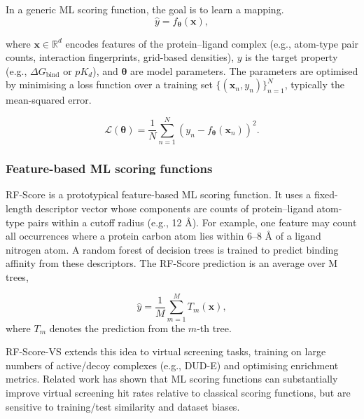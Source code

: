 \documentclass[12pt]{article}
\begin{document}
In a generic ML scoring function, the goal is to learn a mapping.
\begin{equation}
    \hat{y} = f_{\boldsymbol{\theta}}(\mathbf{x}),
\end{equation}

where $\mathbf{x} \in \mathbb{R}^d$ encodes features of the protein--ligand complex (e.g., atom-type pair counts, interaction fingerprints, grid-based densities), $y$ is the target property (e.g., $\Delta G_{\text{bind}}$ or $pK_d$), and $\boldsymbol{\theta}$ are model parameters. The parameters are optimised by minimising a loss function over a training set $\{(\mathbf{x}_n, y_n)\}_{n=1}^N$, typically the mean-squared error.

\begin{equation}
    \mathcal{L}(\boldsymbol{\theta}) = \frac{1}{N} \sum_{n=1}^N \left( y_n - f_{\boldsymbol{\theta}}(\mathbf{x}_n) \right)^2.
\end{equation}

\subsubsection{Feature-based ML scoring functions}
RF-Score is a prototypical feature-based ML scoring function\cite{CH3_Ballester2010_RFScore}. It uses a fixed-length descriptor vector whose components are counts of protein--ligand atom-type pairs within a cutoff radius (e.g., 12 \r{A}). For example, one feature may count all occurrences where a protein carbon atom lies within 6--8 \r{A} of a ligand nitrogen atom. A random forest of decision trees is trained to predict binding affinity from these descriptors. The RF-Score prediction is an average over M trees,

\begin{equation}
    \hat{y} = \frac{1}{M} \sum_{m=1}^{M} T_m(\mathbf{x}),
\end{equation}
where $T_m$ denotes the prediction from the $m$-th tree.

RF-Score-VS\cite{CH3_Wojcikowski2017_RFScoreVS} extends this idea to virtual screening tasks, training on large numbers of active/decoy complexes (e.g., DUD-E) and optimising enrichment metrics. Related work\cite{CH3_li2021machine,CH3_li2017structural} has shown that ML scoring functions can substantially improve virtual screening hit rates relative to classical scoring functions, but are sensitive to training/test similarity and dataset biases.
\end{document}
